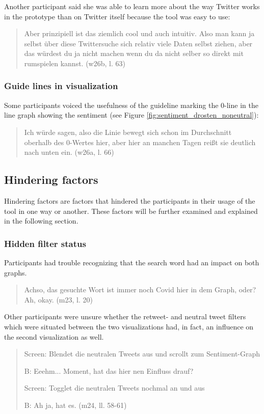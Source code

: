 Another participant said she was able to learn more about the way Twitter works in the prototype than on Twitter itself because the tool was easy to use:

\begin{quote}
    Aber prinzipiell ist das ziemlich cool und auch intuitiv. Also man kann ja selbst über diese Twittersuche sich relativ viele Daten selbst ziehen, aber das würdest du ja nicht machen wenn du da nicht selber so direkt mit rumspielen kannst. (w26b, l. 63)
\end{quote}

\subsubsection*{Guide lines in visualization}
Some participants voiced the usefulness of the guideline marking the 0-line in the line graph showing the sentiment (see Figure \ref{fig:sentiment_drosten_noneutral}):

\begin{quote}
    Ich würde sagen, also die Linie bewegt sich schon im Durchschnitt oberhalb des 0-Wertes hier, aber hier an manchen Tagen reißt sie deutlich nach unten ein. (w26a, l. 66)
\end{quote}

\clearpage
\subsection{Hindering factors}
Hindering factors are factors that hindered the participants in their usage of the tool in one way or another. These factors will be further examined and explained in the following section.

\subsubsection*{Hidden filter status}
Participants had trouble recognizing that the search word had an impact on both graphs.

\begin{quote}
    Achso, das gesuchte Wort ist immer noch Covid hier in dem Graph, oder? Ah, okay. (m23, l. 20)
\end{quote}

Other participants were unsure whether the retweet- and neutral tweet filters which were situated between the two visualizations had, in fact, an influence on the second visualization as well.

\begin{quote}
    Screen: Blendet die neutralen Tweets aus und scrollt zum Sentiment-Graph

    B: Eeehm... Moment, hat das hier nen Einfluss drauf?

    Screen: Togglet die neutralen Tweets nochmal an und aus

    B: Ah ja, hat es. (m24, ll. 58-61)
\end{quote}

